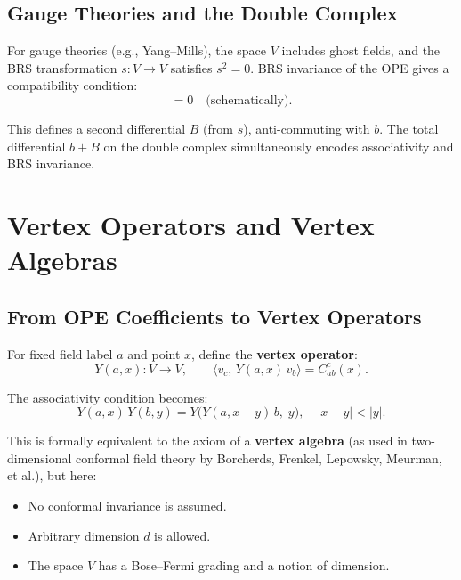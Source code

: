 \documentclass[11pt,a4paper]{article}
\begin{document}
\subsection{Gauge Theories and the Double Complex}

For gauge theories (e.g., Yang--Mills), the space $V$ includes ghost
fields, and the BRS transformation $s: V \to V$ satisfies $s^2 = 0$.
BRS invariance of the OPE gives a compatibility condition:
\begin{equation}
  [s, C(x_1,x_2;\,y)] = 0 \quad\text{(schematically)}.
\end{equation}

This defines a second differential $B$ (from $s$), anti-commuting with $b$.
The total differential $b + B$ on the double complex simultaneously
encodes associativity and BRS invariance.

\section{Vertex Operators and Vertex Algebras}

\subsection{From OPE Coefficients to Vertex Operators}

For fixed field label $a$ and point $x$, define the \textbf{vertex operator}:
\begin{equation}
  Y(a, x): V \longrightarrow V, \qquad
  \langle v_c,\, Y(a,x)\, v_b \rangle = C^c_{ab}(x).
\end{equation}

The associativity condition becomes:
\begin{equation}
  Y(a, x)\, Y(b, y) = Y\bigl(Y(a, x-y)\, b,\; y\bigr),
  \quad |x-y| < |y|.
\end{equation}

This is formally equivalent to the axiom of a \textbf{vertex algebra}
(as used in two-dimensional conformal field theory by Borcherds, Frenkel,
Lepowsky, Meurman, et al.), but here:
\begin{itemize}[nosep]
  \item No conformal invariance is assumed.
  \item Arbitrary dimension $d$ is allowed.
  \item The space $V$ has a Bose--Fermi grading and a notion of dimension.
\end{itemize}
\end{document}
